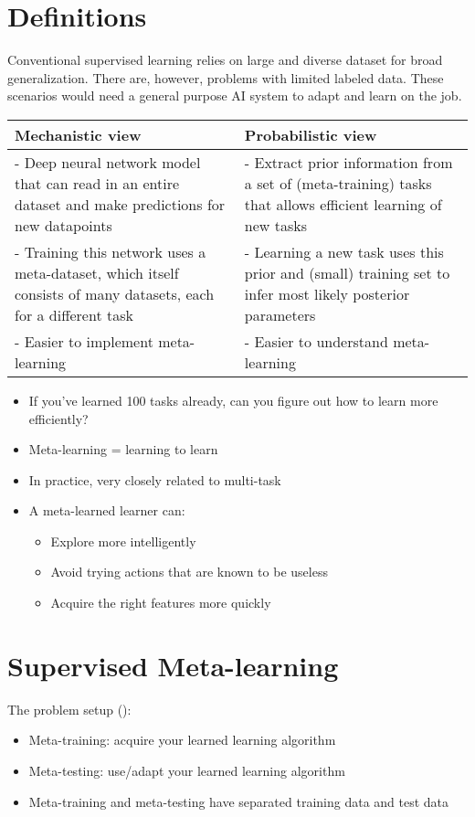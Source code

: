 \section{Definitions}
Conventional supervised learning relies on large and diverse dataset for broad generalization. There are, however, problems with limited labeled data. These scenarios would need a general purpose \ac{AI} system to adapt and learn on the job.

\begin{center}
	\begin{tabular}{p{8cm}|p{8cm}}
		Mechanistic view & Probabilistic view\\
		\hline\hline
		- Deep neural network model that can read in an entire dataset and make predictions for new datapoints  & - Extract prior information from a set of (meta-training) tasks that allows efficient learning of new tasks\\
		- Training this network uses a meta-dataset, which itself consists of many datasets, each for a different task & - Learning a new task uses this prior and (small) training set to infer most likely posterior parameters\\
		- Easier to implement meta-learning & - Easier to understand meta-learning
	\end{tabular}
\end{center}

\begin{itemize}
	\item If you’ve learned 100 tasks already, can you figure out how to learn more efficiently?
	\item Meta-learning = learning to learn
	\item In practice, very closely related to multi-task
	\item A meta-learned learner can:
	\begin{itemize}
		\item Explore more intelligently
		\item Avoid trying actions that are known to be useless
		\item Acquire the right features more quickly
	\end{itemize}
\end{itemize}

\section{Supervised Meta-learning}
The problem setup ():
\begin{itemize}
	\item Meta-training: acquire your learned learning algorithm
	\item Meta-testing: use/adapt your learned learning algorithm
	\item Meta-training and meta-testing have separated training data and test data
\end{itemize}

